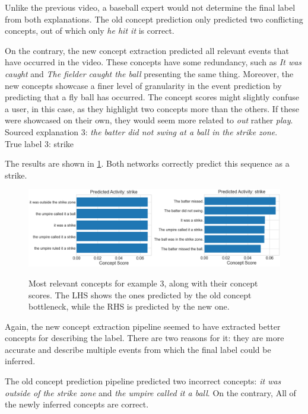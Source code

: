 Unlike the previous video, a baseball expert would not determine the final label from both explanations.
The old concept prediction only predicted two conflicting concepts, out of which only \emph{he hit it} is correct.

On the contrary, the new concept extraction predicted all relevant events that have occurred in the video.
These concepts have some redundancy, such as \emph{It was caught} and \emph{The fielder caught the ball} presenting the same thing.
Moreover, the new concepts showcase a finer level of granularity in the event prediction by predicting that a fly ball has occurred. 
The concept scores might slightly confuse a user, in this case, as they highlight two concepts more than the others. 
If these were showcased on their own, they would seem more related to \textit{out} rather \emph{play}. \\

Sourced explanation 3: \emph{the batter did not swing at a ball in the strike zone}. \\
True label 3: strike

The results are shown in \ref{concept-results-3}.
Both networks correctly predict this sequence as a strike.

\begin{figure}[h]
\caption{Most relevant concepts for example 3, along with their concept scores. The LHS shows the ones predicted by the old concept bottleneck, while the RHS is predicted by the new one.}
\centering
\includegraphics[width=\textwidth]{concept-bottleneck-pipeline/explanations_concepts3.png}
\label{concept-results-3}
\end{figure}

Again, the new concept extraction pipeline seemed to have extracted better concepts for describing the label.
There are two reasons for it: they are more accurate and describe multiple events from which the final label could be inferred.

The old concept prediction pipeline predicted two incorrect concepts: \emph{it was outside of the strike zone} and \emph{the umpire called it a ball}.
On the contrary, All of the newly inferred concepts are correct.

